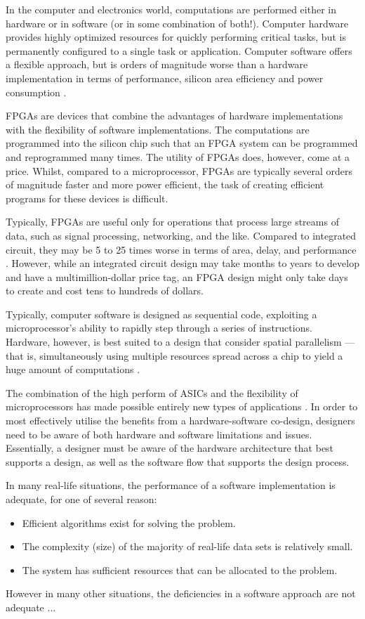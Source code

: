 In the computer and electronics world, computations are performed either in
hardware or in software (or in some combination of both!). Computer hardware
provides highly optimized resources for quickly performing critical tasks, but
is permanently configured to a single task or application. Computer software
offers a flexible approach, but is orders of magnitude worse than a hardware
implementation in terms of performance, silicon area efficiency and power
consumption \cite{Hauck:2007}.

\glspl{FPGA} are devices that combine the advantages of hardware implementations
with the flexibility of software implementations. The computations are
programmed into the silicon chip such that an FPGA system can be programmed and
reprogrammed many times. The utility of FPGAs does, however, come at a price.
Whilst, compared to a microprocessor, FPGAs are typically several orders of
magnitude faster and more power efficient, the task of creating efficient
programs for these devices is difficult.

Typically, \glspl{FPGA} are useful only for operations that process large
streams of data, such as signal processing, networking, and the like. Compared
to integrated circuit, they may be 5 to 25 times worse in terms of area, delay,
and performance \cite{Hauck:2007}. However, while an integrated circuit design
may take months to years to develop and have a multimillion-dollar price tag, an
\gls{FPGA} design might only take days to create and cost tens to hundreds of
dollars.

Typically, computer software is designed as sequential code, exploiting a
microprocessor's ability to rapidly step through a series of instructions.
Hardware, however, is best suited to a design that consider spatial parallelism
--- that is, simultaneously using multiple resources spread across a chip to
yield a huge amount of computations \cite{Hauck:2007}.

The combination of the high perform of \glspl{ASIC} and the flexibility of
microprocessors has made possible entirely new types of applications
\cite{Hauck:2007}. In order to most effectively utilise the benefits from a
hardware-software co-design, designers need to be aware of both hardware and
software limitations and issues. Essentially, a designer must be aware of the
hardware architecture that best supports a design, as well as the software flow
that supports the design process.

In many real-life situations, the performance of a software implementation is
adequate, for one of several reason:
\begin{itemize}
    \item Efficient algorithms exist for solving the problem.
    \item The complexity (size) of the majority of real-life data sets is
        relatively small.
    \item The system has sufficient resources that can be allocated to the
        problem.
\end{itemize}

However in many other situations, the deficiencies in a software approach are
not adequate ...
